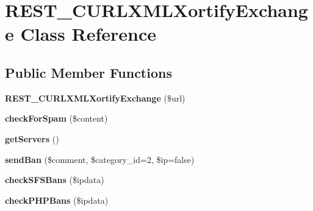 \hypertarget{class_r_e_s_t___c_u_r_l_x_m_l_xortify_exchange}{\section{R\-E\-S\-T\-\_\-\-C\-U\-R\-L\-X\-M\-L\-Xortify\-Exchange Class Reference}
\label{class_r_e_s_t___c_u_r_l_x_m_l_xortify_exchange}
}
\subsection*{Public Member Functions}
\begin{DoxyCompactItemize}
\item 
\hypertarget{class_r_e_s_t___c_u_r_l_x_m_l_xortify_exchange_ab6114b6ef43b544c6ca514f363f88e45}{{\bfseries R\-E\-S\-T\-\_\-\-C\-U\-R\-L\-X\-M\-L\-Xortify\-Exchange} (\$url)}\label{class_r_e_s_t___c_u_r_l_x_m_l_xortify_exchange_ab6114b6ef43b544c6ca514f363f88e45}

\item 
\hypertarget{class_r_e_s_t___c_u_r_l_x_m_l_xortify_exchange_a7a4f53c3841dc7806455261af557d514}{{\bfseries check\-For\-Spam} (\$content)}\label{class_r_e_s_t___c_u_r_l_x_m_l_xortify_exchange_a7a4f53c3841dc7806455261af557d514}

\item 
\hypertarget{class_r_e_s_t___c_u_r_l_x_m_l_xortify_exchange_a882f365bc81e207dc2123ef707735e82}{{\bfseries get\-Servers} ()}\label{class_r_e_s_t___c_u_r_l_x_m_l_xortify_exchange_a882f365bc81e207dc2123ef707735e82}

\item 
\hypertarget{class_r_e_s_t___c_u_r_l_x_m_l_xortify_exchange_a0293acfa4afe0cb5b2816352a35d8ca7}{{\bfseries send\-Ban} (\$comment, \$category\-\_\-id=2, \$ip=false)}\label{class_r_e_s_t___c_u_r_l_x_m_l_xortify_exchange_a0293acfa4afe0cb5b2816352a35d8ca7}

\item 
\hypertarget{class_r_e_s_t___c_u_r_l_x_m_l_xortify_exchange_a985a563a84e3e5c54694fcce192bda53}{{\bfseries check\-S\-F\-S\-Bans} (\$ipdata)}\label{class_r_e_s_t___c_u_r_l_x_m_l_xortify_exchange_a985a563a84e3e5c54694fcce192bda53}

\item 
\hypertarget{class_r_e_s_t___c_u_r_l_x_m_l_xortify_exchange_aeb1bf9aaee4718870adbd07333490aaf}{{\bfseries check\-P\-H\-P\-Bans} (\$ipdata)}\label{class_r_e_s_t___c_u_r_l_x_m_l_xortify_exchange_aeb1bf9aaee4718870adbd07333490aaf}


\end{DoxyCompactItemize}
